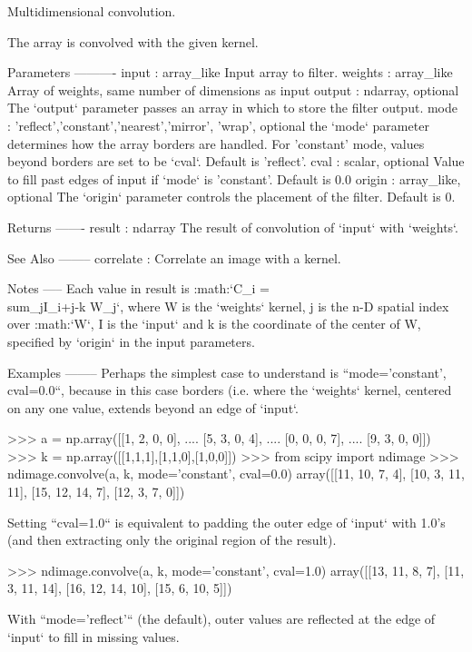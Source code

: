 \begin{DoxyVerb}Multidimensional convolution.

The array is convolved with the given kernel.

Parameters
----------
input : array_like
    Input array to filter.
weights : array_like
    Array of weights, same number of dimensions as input
output : ndarray, optional
    The `output` parameter passes an array in which to store the
    filter output.
mode : {'reflect','constant','nearest','mirror', 'wrap'}, optional
    the `mode` parameter determines how the array borders are
    handled. For 'constant' mode, values beyond borders are set to be
    `cval`. Default is 'reflect'.
cval : scalar, optional
    Value to fill past edges of input if `mode` is 'constant'. Default
    is 0.0
origin : array_like, optional
    The `origin` parameter controls the placement of the filter.
    Default is 0.

Returns
-------
result : ndarray
    The result of convolution of `input` with `weights`.

See Also
--------
correlate : Correlate an image with a kernel.

Notes
-----
Each value in result is :math:`C_i = \\sum_j{I_{i+j-k} W_j}`, where
W is the `weights` kernel,
j is the n-D spatial index over :math:`W`,
I is the `input` and k is the coordinate of the center of
W, specified by `origin` in the input parameters.

Examples
--------
Perhaps the simplest case to understand is ``mode='constant', cval=0.0``,
because in this case borders (i.e. where the `weights` kernel, centered
on any one value, extends beyond an edge of `input`.

>>> a = np.array([[1, 2, 0, 0],
....    [5, 3, 0, 4],
....    [0, 0, 0, 7],
....    [9, 3, 0, 0]])
>>> k = np.array([[1,1,1],[1,1,0],[1,0,0]])
>>> from scipy import ndimage
>>> ndimage.convolve(a, k, mode='constant', cval=0.0)
array([[11, 10,  7,  4],
       [10,  3, 11, 11],
       [15, 12, 14,  7],
       [12,  3,  7,  0]])

Setting ``cval=1.0`` is equivalent to padding the outer edge of `input`
with 1.0's (and then extracting only the original region of the result).

>>> ndimage.convolve(a, k, mode='constant', cval=1.0)
array([[13, 11,  8,  7],
       [11,  3, 11, 14],
       [16, 12, 14, 10],
       [15,  6, 10,  5]])

With ``mode='reflect'`` (the default), outer values are reflected at the
edge of `input` to fill in missing values.


\end{DoxyVerb}
